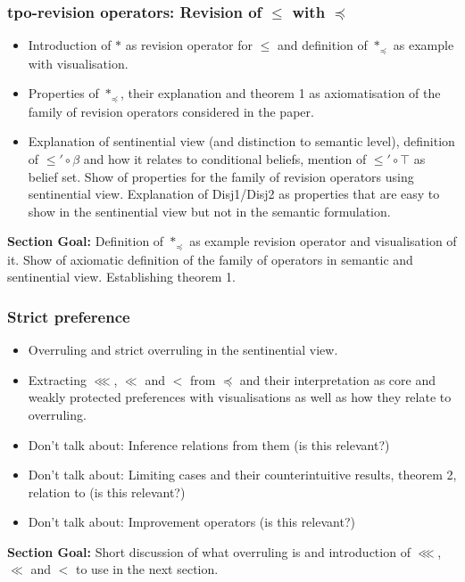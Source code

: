 \documentclass[11pt]{article}
\begin{document}
\subsubsection{tpo-revision operators: Revision of $\leq$ with $\preceq$}
\begin{itemize}
    \item Introduction of $\ast$ as revision operator for $\leq$ and definition of $\ast_{\preceq}$ as example with visualisation.
    \item Properties of $\ast_{\preceq}$, their explanation and theorem 1 as axiomatisation of the family of revision operators considered in the paper.
    \item Explanation of sentinential view (and distinction to semantic level), definition of $\leq' \circ \beta $ and how it relates to conditional beliefs, mention of $\leq' \circ \top $ as belief set. Show of properties for the family of revision operators using sentinential view. Explanation of Disj1/Disj2 as properties that are easy to show in the sentinential view but not in the semantic formulation.
\end{itemize}
\textbf{Section Goal:} Definition of $\ast_{\preceq}$ as example revision operator and visualisation of it. Show of axiomatic definition of the family of operators in semantic and sentinential view. Establishing theorem 1.

\subsubsection{Strict preference}
\begin{itemize}
    \item Overruling and strict overruling in the sentinential view.
    \item Extracting $\lll$, $\ll$ and $<$ from $\preceq$ and their interpretation as core and weakly protected preferences with visualisations as well as how they relate to overruling.
    \item Don't talk about: Inference relations from them (is this relevant?)
    \item Don't talk about: Limiting cases and their counterintuitive results, theorem 2, relation to \cite{Darwiche1997} (is this relevant?)
    \item Don't talk about: Improvement operators (is this relevant?)
\end{itemize}
\textbf{Section Goal:} Short discussion of what overruling is and introduction of $\lll$, $\ll$ and $<$ to use in the next section.
\end{document}
